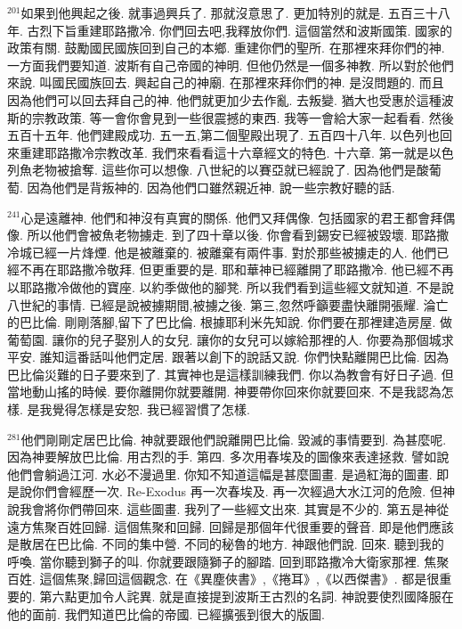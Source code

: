 \documentclass{book}
\begin{document}
$^{201}$如果到他興起之後.
就事過興兵了.
那就沒意思了.
更加特別的就是.
五百三十八年.
古烈下旨重建耶路撒冷.
你們回去吧,我釋放你們.
這個當然和波斯國策.
國家的政策有關.
鼓勵國民國族回到自己的本鄉.
重建你們的聖所.
在那裡來拜你們的神.
一方面我們要知道.
波斯有自己帝國的神明.
但他仍然是一個多神教.
所以對於他們來說.
叫國民國族回去.
興起自己的神廟.
在那裡來拜你們的神.
是沒問題的.
而且因為他們可以回去拜自己的神.
他們就更加少去作亂.
去叛變.
猶大也受惠於這種波斯的宗教政策.
等一會你會見到一些很震撼的東西.
我等一會給大家一起看看.
然後五百十五年.
他們建殿成功.
五一五,第二個聖殿出現了.
五百四十八年.
以色列也回來重建耶路撒冷宗教改革.
我們來看看這十六章經文的特色.
十六章.
第一就是以色列魚老物被搶奪.
這些你可以想像.
八世紀的以賽亞就已經說了.
因為他們是酸葡萄.
因為他們是背叛神的.
因為他們口雖然親近神.
說一些宗教好聽的話.

$^{241}$心是遠離神.
他們和神沒有真實的關係.
他們又拜偶像.
包括國家的君王都會拜偶像.
所以他們會被魚老物擄走.
到了四十章以後.
你會看到錫安已經被毀壞.
耶路撒冷城已經一片烽煙.
他是被離棄的.
被離棄有兩件事.
對於那些被擄走的人.
他們已經不再在耶路撒冷敬拜.
但更重要的是.
耶和華神已經離開了耶路撒冷.
他已經不再以耶路撒冷做他的寶座.
以約季做他的腳凳.
所以我們看到這些經文就知道.
不是說八世紀的事情.
已經是說被擄期間,被擄之後.
第三,忽然呼籲要盡快離開張耀.
淪亡的巴比倫.
剛剛落腳,留下了巴比倫.
根據耶利米先知說.
你們要在那裡建造房屋.
做葡萄園.
讓你的兒子娶別人的女兒.
讓你的女兒可以嫁給那裡的人.
你要為那個城求平安.
誰知這番話叫他們定居.
跟著以創下的說話又說.
你們快點離開巴比倫.
因為巴比倫災難的日子要來到了.
其實神也是這樣訓練我們.
你以為教會有好日子過.
但當地動山搖的時候.
要你離開你就要離開.
神要帶你回來你就要回來.
不是我認為怎樣.
是我覺得怎樣是安恕.
我已經習慣了怎樣.

$^{281}$他們剛剛定居巴比倫.
神就要跟他們說離開巴比倫.
毀滅的事情要到.
為甚麼呢.
因為神要解放巴比倫.
用古烈的手.
第四.
多次用春埃及的圖像來表達拯救.
譬如說他們會躺過江河.
水必不漫過里.
你知不知道這幅是甚麼圖畫.
是過紅海的圖畫.
即是說你們會經歷一次.
Re-Exodus 再一次春埃及.
再一次經過大水江河的危險.
但神說我會將你們帶回來.
這些圖畫.
我列了一些經文出來.
其實是不少的.
第五是神從遠方焦聚百姓回歸.
這個焦聚和回歸.
回歸是那個年代很重要的聲音.
即是他們應該是散居在巴比倫.
不同的集中營.
不同的秘魯的地方.
神跟他們說.
回來.
聽到我的呼喚.
當你聽到獅子的叫.
你就要跟隨獅子的腳踏.
回到耶路撒冷大衛家那裡.
焦聚百姓.
這個焦聚,歸回這個觀念.
在《異塵俠書》,《捲耳》,《以西傑書》.
都是很重要的.
第六點更加令人詫異.
就是直接提到波斯王古烈的名詞.
神說要使烈國降服在他的面前.
我們知道巴比倫的帝國.
已經擴張到很大的版圖.
\end{document}
